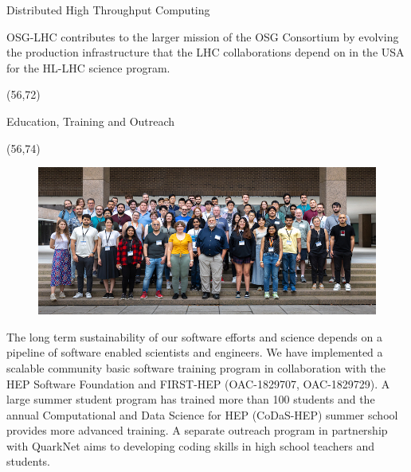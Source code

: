 \documentclass[final]{beamer}
\begin{document}
\begin{frame}{}
\begin{textblock}{25.0}
\begin{block}{Distributed High Throughput Computing}
\begin{textblock}{25.0}
\begin{figure}[tbph]
\end{figure}
OSG-LHC contributes to the larger mission of the OSG Consortium by evolving the production infrastructure that the LHC collaborations depend on in the USA for the HL-LHC science program. 
\end{textblock}
\end{block}
\end{textblock}
\begin{textblock}{25.0}(56,72)
\begin{block}{Education, Training and Outreach}
\begin{textblock}{25.0}(56,74)
\begin{figure}[tbph]
\centering
\includegraphics[width=1.00\textwidth]{images/codas-hep-2023-group-photo-thumbnail.jpg}
\end{figure}
The long term sustainability of our software efforts and science depends on a pipeline of software enabled scientists and engineers. We have implemented a scalable community basic software training program in collaboration with the HEP Software Foundation and FIRST-HEP (OAC-1829707, OAC-1829729). A large summer student program has trained more than 100 students and the annual Computational and Data Science for HEP (CoDaS-HEP) summer school provides more advanced training. A separate outreach program in partnership with QuarkNet aims to developing coding skills in high school teachers and students.
\end{textblock}
\end{block}
\end{textblock}



\end{frame}
\end{document}
